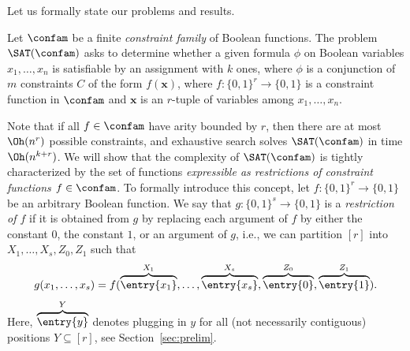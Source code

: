 \setcounter{section}{1}
\setcounter{thm}{0}
Let us formally state our problems and results.
%
\begin{problem}
Let $\confam$ be a finite \emph{constraint family} of Boolean functions. The problem $\SAT(\confam)$ asks to determine whether a given formula $\phi$ on Boolean variables $x_1,\dots,x_n$ is satisfiable by an assignment with $k$ ones, where $\phi$ is a conjunction of $m$ constraints $C$ of the form $f(\mathbf{x})$, where $f:\{0,1\}^r \to \{0,1\}$ is a constraint function in $\confam$ and $\mathbf{x}$ is an $r$-tuple of variables among $x_1,\dots, x_n$.
\end{problem}
%
Note that if all $f\in \confam$ have arity bounded by $r$, then there are at most $\Oh(n^r)$ possible constraints, and exhaustive search solves $\SAT(\confam)$ in time $\Oh(n^{k+r})$.
%
We will show that the complexity of $\SAT(\confam)$ is tightly characterized by the set of functions \emph{expressible as restrictions of constraint functions $f\in \confam$}. To formally introduce this concept, let $f: \{0,1\}^r \to \{0,1\}$ be an arbitrary Boolean function. We say that $g:\{0,1\}^s\to \{0,1\}$ is a \emph{restriction of $f$} if it is obtained from $g$ by replacing each argument of $f$ by either the constant $0$, the constant $1$, or an argument of $g$, i.e., we can partition $[r]$ into $X_1,\dots, X_s, Z_0, Z_1$ such that 
\[ g(x_1,\dots,x_s) = f(\overbrace{\entry{x_1}}^{X_1}, \dots, \overbrace{\entry{x_s}}^{X_s}, \overbrace{\entry{0}}^{Z_0}, \overbrace{\entry{1}}^{Z_1}).\]
Here, $\overbrace{\entry{y}}^Y$ denotes plugging in $y$ for all (not necessarily contiguous) positions $Y\subseteq [r]$, see Section~\ref{sec:prelim}. 
%
   
